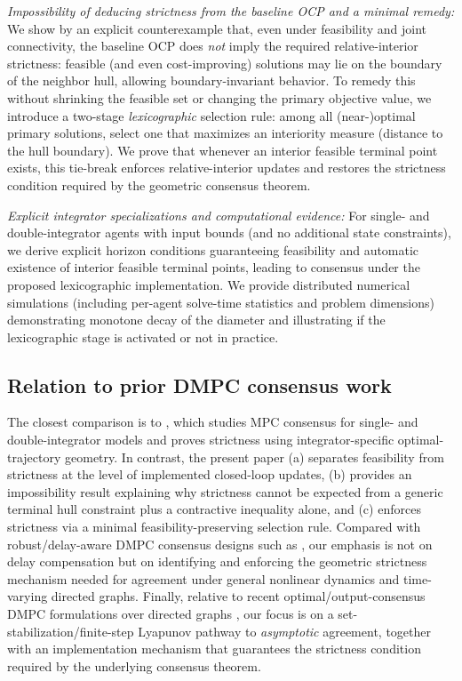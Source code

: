 \documentclass[12pt,draftcls,onecolumn]{IEEEtran}
\begin{document}
\emph{Impossibility of deducing strictness from the baseline OCP and a minimal remedy:}
We show by an explicit counterexample that, even under feasibility and joint connectivity, the baseline OCP does \emph{not} imply the required relative-interior strictness: feasible (and even cost-improving) solutions may lie on the boundary of the neighbor hull, allowing boundary-invariant behavior.
To remedy this without shrinking the feasible set or changing the primary objective value, we introduce a two-stage \emph{lexicographic} selection rule:
among all (near-)optimal primary solutions, select one that maximizes an interiority measure (distance to the hull boundary).
We prove that whenever an interior feasible terminal point exists, this tie-break enforces relative-interior updates and restores the strictness condition required by the geometric consensus theorem.

\emph{Explicit integrator specializations and computational evidence:}
For single- and double-integrator agents with input bounds (and no additional state constraints), we derive explicit horizon conditions guaranteeing feasibility and automatic existence of interior feasible terminal points, leading to consensus under the proposed lexicographic implementation.
We provide distributed numerical simulations (including per-agent solve-time statistics and problem dimensions) demonstrating monotone decay of the diameter and illustrating if the lexicographic stage is activated or not in practice.

\subsection{Relation to prior DMPC consensus work}
The closest comparison is to \cite{Ferrari-Trecate.2009}, which studies MPC consensus for single- and double-integrator models and proves strictness using integrator-specific optimal-trajectory geometry.
In contrast, the present paper (a) separates feasibility from strictness at the level of implemented closed-loop updates, (b) provides an impossibility result explaining why strictness cannot be expected from a generic terminal hull constraint plus a contractive inequality alone, and (c) enforces strictness via a minimal feasibility-preserving selection rule.
Compared with robust/delay-aware DMPC consensus designs such as \cite{Wei.2015}, our emphasis is not on delay compensation but on identifying and enforcing the geometric strictness mechanism needed for agreement under general nonlinear dynamics and time-varying directed graphs.
Finally, relative to recent optimal/output-consensus DMPC formulations over directed graphs \cite{Bai.2025}, our focus is on a set-stabilization/finite-step Lyapunov pathway to \emph{asymptotic} agreement, together with an implementation mechanism that guarantees the strictness condition required by the underlying consensus theorem.
\end{document}
